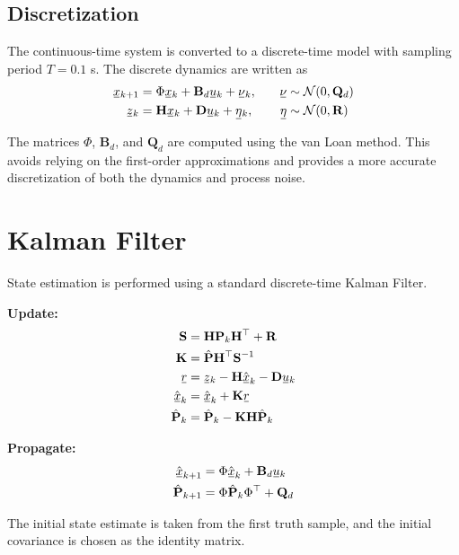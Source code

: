 \documentclass[11pt, letterpaper, twocolumn]{article}
\newcommand{\ul}[1] %
    {{}\mkern1mu\underline{\mkern-1mu#1\mkern-1mu}\mkern1mu}
\begin{document}
\subsection*{Discretization}

The continuous-time system is converted to a discrete-time model with sampling
period $T = 0.1$ s. The discrete dynamics are written as 
\[\begin{aligned}
\ul{x}_{k+1} &= \Phi\ul{x}_k + \mathbf{B}_d\ul{u}_k + \ul{\nu}_k, &\quad \ul{\nu} &\sim \mathcal{N}(0,\mathbf{Q}_d) \\
\ul{z}_k &= \mathbf{H}\ul{x}_k + \mathbf{D}\ul{u}_k + \ul{\eta}_k, &\quad \ul{\eta} &\sim \mathcal{N}(0,\mathbf{R}) 
\end{aligned}
\]

The matrices $\Phi$, $\mathbf{B}_d$, and $\mathbf{Q}_d$ are computed using 
the van Loan method. This avoids relying on the first-order approximations
and provides a more accurate discretization of both the dynamics and 
process noise.

\section*{Kalman Filter}

State estimation is performed using a standard discrete-time Kalman Filter.

\textbf{Update:}
\[\begin{aligned}
\mathbf{S} &= \mathbf{H}\mathbf{P}_k\mathbf{H}^{\top} + \mathbf{R} \\
\mathbf{K} &= \hat{\mathbf{P}}\mathbf{H}^{\top}\mathbf{S}^{-1} \\
\ul{r} &= \ul{z}_k - \mathbf{H}\hat{\ul{x}}_k - \mathbf{D}\ul{u}_k \\
\hat{\ul{x}}_k &= \hat{\ul{x}}_k + \mathbf{K}\ul{r} \\
\hat{\mathbf{P}}_k &= \hat{\mathbf{P}}_k - \mathbf{K}\mathbf{H}\hat{\mathbf{P}}_k
\end{aligned}
\]

\textbf{Propagate:}
\[\begin{aligned}
\hat{\ul{x}}_{k+1} &= \Phi\hat{\ul{x}}_k + \mathbf{B}_d\ul{u}_k \\
\hat{\mathbf{P}}_{k+1} &= \Phi\hat{\mathbf{P}}_k\Phi^{\top} + \mathbf{Q}_d
\end{aligned}
\]

The initial state estimate is taken from the first truth sample, and the 
initial covariance is chosen as the identity matrix.
\end{document}
